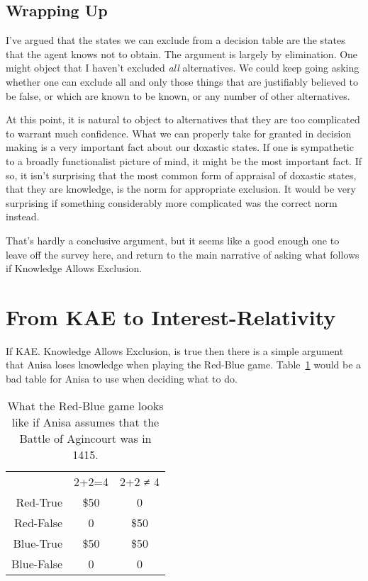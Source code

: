 \documentclass[
  10pt,
  letterpaper,
  twoside]{scrbook}
\begin{document}
\subsection{Wrapping Up}\label{sec-kae-wrapping-ip}

I've argued that the states we can exclude from a decision table are the
states that the agent knows not to obtain. The argument is largely by
elimination. One might object that I haven't excluded \emph{all}
alternatives. We could keep going asking whether one can exclude all and
only those things that are justifiably believed to be false, or which
are known to be known, or any number of other alternatives.

At this point, it is natural to object to alternatives that they are too
complicated to warrant much confidence. What we can properly take for
granted in decision making is a very important fact about our doxastic
states. If one is sympathetic to a broadly functionalist picture of
mind, it might be the most important fact. If so, it isn't surprising
that the most common form of appraisal of doxastic states, that they are
knowledge, is the norm for appropriate exclusion. It would be very
surprising if something considerably more complicated was the correct
norm instead.

That's hardly a conclusive argument, but it seems like a good enough one
to leave off the survey here, and return to the main narrative of asking
what follows if Knowledge Allows Exclusion.

\section{From KAE to Interest-Relativity}\label{sec-from-kae-to-irt}

If KAE. Knowledge Allows Exclusion, is true then there is a simple
argument that Anisa loses knowledge when playing the Red-Blue game.
Table~\ref{tbl-assume-agincourt} would be a bad table for Anisa to use
when deciding what to do.

\begin{longtable}[]{@{}rcc@{}}
\caption{What the Red-Blue game looks like if Anisa assumes that the
Battle of Agincourt was in
1415.}\label{tbl-assume-agincourt}\tabularnewline
\toprule\noalign{}
\endfirsthead
\endhead
\bottomrule\noalign{}
\endlastfoot
~ & 2+2=4 & 2+2 ≠ 4 \\
Red-True & \$50 & 0 \\
Red-False & 0 & \$50 \\
Blue-True & \$50 & \$50 \\
Blue-False & 0 & 0 \\
\end{longtable}
\end{document}
